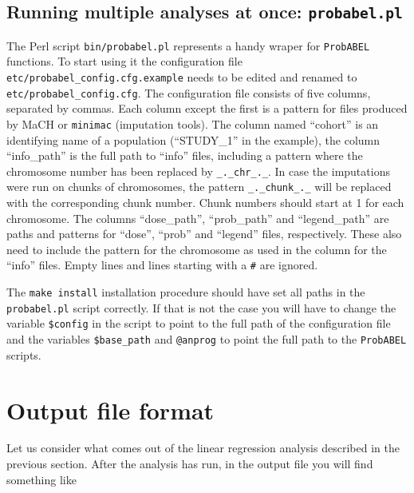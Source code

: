 \documentclass[12pt,a4paper]{article}
\newcommand{\PA}{\texttt{ProbABEL}}
\begin{document}

\subsection{Running multiple analyses at once: \texttt{probabel.pl}}

The Perl script \texttt{bin/probabel.pl} represents a handy wraper for
\PA{} functions.  To start using it the configuration file
\texttt{etc/probabel\_config.cfg.example} needs to be edited and
renamed to \texttt{etc/probabel\_config.cfg}. The configuration file
consists of five columns, separated by commas. Each column except the
first is a pattern for files produced by MaCH or \texttt{minimac}
(imputation tools). The column named ``cohort'' is an identifying name
of a population (``STUDY\_1'' in the example), the column
``info\_path'' is the full path to ``info'' files, including a pattern
where the chromosome number has been replaced by
\texttt{\_.\_chr\_.\_}. In case the imputations were run on chunks of
chromosomes, the pattern \texttt{\_.\_chunk\_.\_} will be replaced
with the corresponding chunk number. Chunk numbers should start at 1
for each chromosome. The columns ``dose\_path'', ``prob\_path''
and ``legend\_path'' are paths and patterns for ``dose'', ``prob'' and
``legend'' files, respectively. These also need to include the pattern
for the chromosome as used in the column for the ``info'' files.
Empty lines and lines starting with a \texttt{\#} are ignored.

The \texttt{make install} installation procedure should have set all
paths in the \texttt{probabel.pl} script correctly. If that is not the
case you will have to change the variable \texttt{\$config} in the
script to point to the full path of the configuration file and the
variables \texttt{\$base\_path} and \texttt{@anprog} to point the full
path to the \PA{} scripts.


\section{Output file format}
Let us consider what comes out of the linear regression analysis
described in the previous section. After the analysis has run, in
the output file you will find something like
\begin{small}

\end{small}
\end{document}
